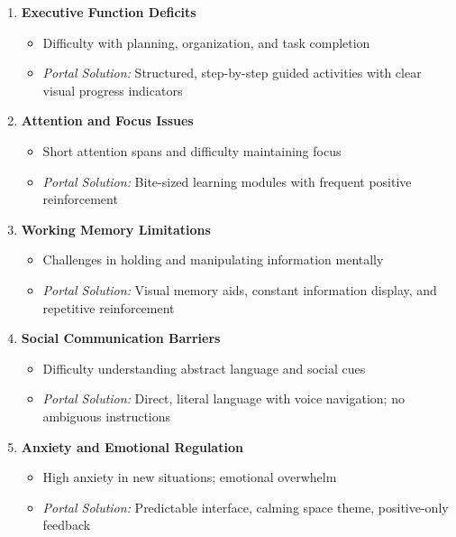 \documentclass[12pt, a4paper]{article}
\begin{document}
\begin{tcolorbox}[colback=nebulapink!5, colframe=nebulapink, title=\textbf{Key Challenges Addressed}]

\begin{enumerate}[leftmargin=*, itemsep=8pt]
    \item \textbf{Executive Function Deficits}
    \begin{itemize}
        \item Difficulty with planning, organization, and task completion
        \item \textit{Portal Solution:} Structured, step-by-step guided activities with clear visual progress indicators
    \end{itemize}
    
    \item \textbf{Attention and Focus Issues}
    \begin{itemize}
        \item Short attention spans and difficulty maintaining focus
        \item \textit{Portal Solution:} Bite-sized learning modules with frequent positive reinforcement
    \end{itemize}
    
    \item \textbf{Working Memory Limitations}
    \begin{itemize}
        \item Challenges in holding and manipulating information mentally
        \item \textit{Portal Solution:} Visual memory aids, constant information display, and repetitive reinforcement
    \end{itemize}
    
    \item \textbf{Social Communication Barriers}
    \begin{itemize}
        \item Difficulty understanding abstract language and social cues
        \item \textit{Portal Solution:} Direct, literal language with voice navigation; no ambiguous instructions
    \end{itemize}
    
    \item \textbf{Anxiety and Emotional Regulation}
    \begin{itemize}
        \item High anxiety in new situations; emotional overwhelm
        \item \textit{Portal Solution:} Predictable interface, calming space theme, positive-only feedback
    \end{itemize}
    

\end{enumerate}
\end{tcolorbox}
\end{document}

